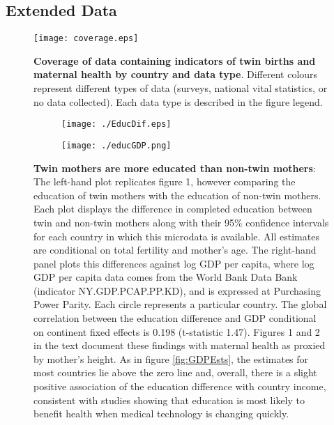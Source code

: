 \documentclass{nature}
\begin{document}
\begin{linenumbers}
\clearpage
\setcounter{figure}{0}
\setcounter{table}{0}
\renewcommand{\tablename}{Extended Data Table}
\renewcommand{\thetable}{E\arabic{table}}
\renewcommand{\figurename}{Extended Data Figure}
\renewcommand{\thefigure}{E\arabic{figure}}
\section{Extended Data}
\begin{spacing}{1}

\begin{figure}[htpb!]
\texttt{[image: coverage.eps]}
\caption{\textbf{Coverage of data containing indicators of twin births and maternal health by country and data type}. {\footnotesize  Different colours represent different types of data (surveys, national vital statistics, or no data collected).  Each data type is described in the figure legend.}}
\label{fig:twincoverage}
\end{figure}

  
\begin{figure}[htpb!]
\begin{subfigure}{.5\textwidth}
  \texttt{[image: ./EducDif.eps]}
\end{subfigure}%
\begin{subfigure}{.5\textwidth}
  \texttt{[image: ./educGDP.png]}
\end{subfigure}%
\vspace{5mm}
\caption{\textbf{Twin mothers are more educated than non-twin mothers}: {\footnotesize The left-hand plot replicates figure 1, however comparing the education of twin mothers with the education of non-twin mothers.  Each plot displays the difference in completed education between twin and non-twin mothers along with their 95\% confidence intervals for each country in which this microdata is available.  All estimates are conditional on total fertility and mother's age.  The right-hand panel plots this differences against log GDP per capita, where log GDP per capita data comes from the World Bank Data Bank (indicator NY.GDP.PCAP.PP.KD), and is expressed at Purchasing Power Parity.  Each circle represents a particular country. The global correlation between the education difference and GDP conditional on continent fixed effects is 0.198 (t-statistic 1.47). Figures 1 and 2 in the text document these findings with maternal health as proxied by mother's height. As in figure \ref{fig:GDPEsts}, the estimates for most countries lie above the zero line and, overall, there is a slight positive association of the education difference with country income, consistent with studies showing that education is most likely to benefit health when medical technology is changing quickly\cite{LlerasMuneyGlied2008}.}}
\label{fig:educAll}
\end{figure}


\end{spacing}
\end{linenumbers}
\end{document}
